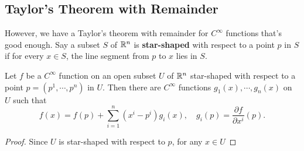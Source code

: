 \subsection{Taylor's Theorem with Remainder}
However, we have a Taylor's theorem with remainder for $C^{\infty}$ functions that's good enough. Say a subset $S$ of $\mathbb{R}^n $ is \textbf{star-shaped} with respect to a point $p$ in $S$ if for every $x\in S$, the line segment from $p$ to $x$ lies in $S$.
\begin{lemma}
    Let $f$ be a $C^{\infty}$ function on an open subset $U$ of $\mathbb{R}^n $ star-shaped with respect to a point $p=(p^1,\cdots ,p^n )$ in $U$. Then there are $C^{\infty}$ functions $g_1(x),\cdots ,g_n (x)$ on $U$ such that \[
        f(x)=f(p)+\sum_{i=1}^{n} (x^i -p^i )g_i (x), \quad g_i (p)=\frac{\partial f}{\partial x^i }(p).
    \]  
\end{lemma}
\begin{proof}
    Since $U$ is star-shaped with respect to $p$, for any $x\in U$
\end{proof}

